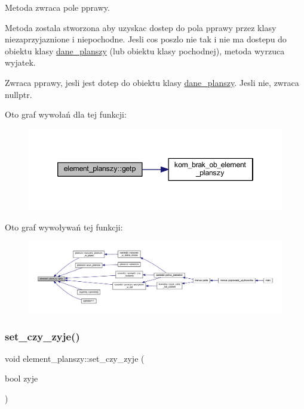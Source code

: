 Metoda zwraca pole pprawy.

Metoda zostala stworzona aby uzyskac dostep do pola pprawy przez klasy niezaprzyjaznione i niepochodne. Jesli cos poszlo nie tak i nie ma dostepu do obiektu klasy \mbox{\hyperlink{classdane__planszy}{dane\+\_\+planszy}} (lub obiektu klasy pochodnej), metoda wyrzuca wyjatek. \begin{DoxyReturn}{Zwraca}
pprawy, jesli jest dotep do obiektu klasy \mbox{\hyperlink{classdane__planszy}{dane\+\_\+planszy}}. Jesli nie, zwraca nullptr. 
\end{DoxyReturn}
Oto graf wywołań dla tej funkcji\+:
\nopagebreak
\begin{figure}[H]
\begin{center}
\leavevmode
\includegraphics[width=346pt]{classelement__planszy_a7b72040bbb58d9092a63ed2d0fd18dca_cgraph}
\end{center}
\end{figure}
Oto graf wywoływań tej funkcji\+:
\nopagebreak
\begin{figure}[H]
\begin{center}
\leavevmode
\includegraphics[width=350pt]{classelement__planszy_a7b72040bbb58d9092a63ed2d0fd18dca_icgraph}
\end{center}
\end{figure}
\mbox{\label{classelement__planszy_a0b46a16355fcb3123ad3d1a889de5e1f}} 
\subsubsection{\texorpdfstring{set\+\_\+czy\+\_\+zyje()}{set\_czy\_zyje()}}
{\footnotesize\ttfamily void element\+\_\+planszy\+::set\+\_\+czy\+\_\+zyje (\begin{DoxyParamCaption}\item[{bool}]{zyje }\end{DoxyParamCaption})}

